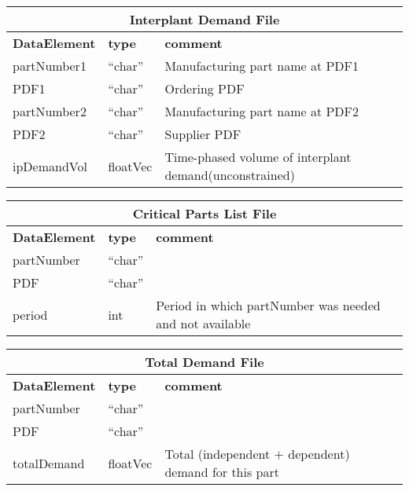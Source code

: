 \vspace{.5in}

\begin{tabular}{llp{4in}}
\multicolumn{3}{c}{{\bf Interplant Demand File}}\\ \hline\hline
{\bf DataElement} &  {\bf type}  &   {\bf comment} \\ \hline
partNumber1 &  ``char'' &  Manufacturing part name at PDF1  \\ 
PDF1   & ``char'' & Ordering PDF \\
partNumber2 &  ``char'' & Manufacturing part name at PDF2    \\ 
PDF2   & ``char'' & Supplier PDF \\
ipDemandVol & floatVec &  Time-phased volume of interplant demand(unconstrained)  \\
\end{tabular}

\vspace{.5in}

\begin{tabular}{llp{4in}}
\multicolumn{3}{c}{{\bf Critical Parts List File}}\\ \hline\hline
{\bf DataElement} &  {\bf type}  &   {\bf comment} \\ \hline
partNumber &  ``char''     \\ 
PDF   & ``char''  \\
period & int & Period in which partNumber was needed and not available
\end{tabular}

\vspace{.5in}

\begin{tabular}{llp{4in}}
\multicolumn{3}{c}{{\bf Total Demand File}}\\ \hline\hline
{\bf DataElement} &  {\bf type}  &   {\bf comment} \\ \hline
partNumber &  ``char''     \\ 
PDF   & ``char''  \\
totalDemand & floatVec & Total (independent $+$ dependent) demand for this part
\end{tabular}

\vspace{.5in}

